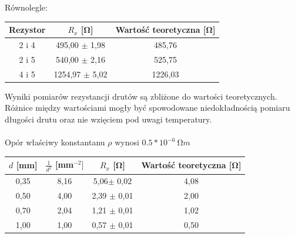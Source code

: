 \documentclass{article}
\begin{document}
Równolegle:

\begin{center}
    \begin{tabular}{ c | c | c}
    Rezystor & $R_x$ [\si{\ohm}] & Wartość teoretyczna [\si{\ohm}]\\
    \hline
    2 i 4    & 495,00 $\pm$ 1,98 & 485,76\\ 
    2 i 5  & 540,00 $\pm$ 2,16 & 525,75\\ 
    4 i 5    & 1254,97 $\pm$ 5,02 &  1226,03\\ 
    
    \end{tabular}
\end{center}

Wyniki pomiarów rezystancji drutów są zbliżone do wartości teoretycznych. Różnice między wartościami mogły być spowodowane niedokładnością pomiaru długości drutu oraz nie wzięciem pod uwagi temperatury.\\\\
Opór właściwy konstantanu $\rho$ wynosi $0.5*10^{-6} \ \si{\ohm}m$

\begin{center}
    \begin{tabular}{ c|c | c|c }
    $d$ [mm] & $\frac{1}{d^2}$ [mm$^{-2}]$ &$R_x$ [\si{\ohm}] & Wartość teoretyczna [\si{\ohm}]\\
    \hline
    0,35 & 8,16 & 5,06$\pm$ 0,02 & 4,08\\ 
     0,50 & 4,00 &2,39 $\pm$ 0,01 & 2,00\\ 
     0,70 & 2,04 &1,21 $\pm$ 0,01 & 1,02\\ 
     1,00 & 1,00 &0,57 $\pm$ 0,01 & 0,50\\ 
     
    \end{tabular}
\end{center}
\end{document}
